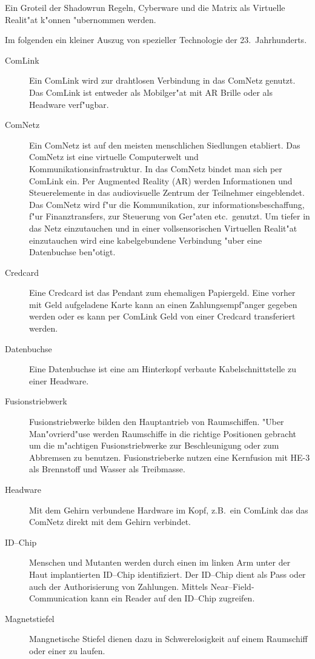 \begin{appendices}
Ein Gro\3teil der Shadowrun Regeln, Cyberware und die Matrix als Virtuelle Realit"at k"onnen "ubernommen werden.

Im folgenden ein kleiner Auszug von spezieller Technologie der 23.~Jahrhunderts.

\begin{description}
\item [ComLink] Ein ComLink wird zur drahtlosen Verbindung in das ComNetz genutzt. Das ComLink ist entweder als
      Mobilger"at mit AR Brille oder als Headware verf"ugbar.
\item [ComNetz] Ein ComNetz ist auf den meisten menschlichen Siedlungen etabliert. Das ComNetz ist eine virtuelle
      Computerwelt und Kommunikationsinfrastruktur. In das ComNetz bindet man sich per ComLink ein. Per Augmented Reality (AR) werden Informationen und Steuerelemente in das audiovisuelle Zentrum der Teilnehmer eingeblendet. Das ComNetz wird f"ur die Kommunikation, zur informationsbeschaffung, f"ur Finanztransfers, zur Steuerung von Ger"aten etc.~genutzt. Um tiefer in das Netz einzutauchen und in einer vollsensorischen Virtuellen Realit"at einzutauchen wird eine kabelgebundene Verbindung "uber eine Datenbuchse ben"otigt.
\item [Credcard] Eine Credcard ist das Pendant zum ehemaligen Papiergeld. Eine vorher mit Geld aufgeladene Karte kann an
      einen Zahlungsempf"anger gegeben werden oder es kann per ComLink Geld von einer Credcard transferiert werden.
\item [Datenbuchse] Eine Datenbuchse ist eine am Hinterkopf verbaute Kabelschnittstelle zu einer Headware.
\item [Fusionstriebwerk] Fusionstriebwerke bilden den Hauptantrieb von Raumschiffen. "Uber Man"ovrierd"use werden
      Raumschiffe in die richtige Positionen gebracht um die m"achtigen Fusionstriebwerke zur Beschleunigung oder zum Abbremsen zu benutzen. Fusionstrieberke nutzen eine Kernfusion mit HE-3 als Brennstoff und Wasser als Treibmasse.
\item [Headware] Mit dem Gehirn verbundene Hardware im Kopf, z.B.~ein ComLink das das ComNetz direkt mit dem Gehirn
      verbindet.
\item [ID--Chip] Menschen und Mutanten werden durch einen im linken Arm unter der Haut implantierten ID--Chip
      identifiziert. Der ID--Chip dient als Pass oder auch der Authorisierung von Zahlungen. Mittels Near--Field-Communication kann ein Reader auf den ID--Chip zugreifen.
\item [Magnetstiefel] Mangnetische Stiefel dienen dazu in Schwerelosigkeit auf einem Raumschiff oder einer zu laufen.

\end{description}
\end{appendices}
